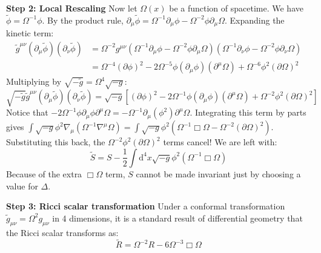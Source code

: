 \begin{solution}
\textbf{Step 2: Local Rescaling}
Now let $\Omega(x)$ be a function of spacetime. We have $\tilde{\phi} = \Omega^{-1} \phi$.
By the product rule, $\partial_\mu \tilde{\phi} = \Omega^{-1} \partial_\mu \phi - \Omega^{-2} \phi \partial_\mu \Omega$.
Expanding the kinetic term:
\[ \begin{aligned}
    \tilde{g}^{\mu\nu} (\partial_\mu \tilde{\phi}) (\partial_\nu \tilde{\phi}) &= \Omega^{-2} g^{\mu\nu} (\Omega^{-1} \partial_\mu \phi - \Omega^{-2} \phi \partial_\mu \Omega) (\Omega^{-1} \partial_\nu \phi - \Omega^{-2} \phi \partial_\nu \Omega) \\
    &= \Omega^{-4} (\partial \phi)^2 - 2\Omega^{-5} \phi (\partial_\mu \phi)(\partial^\mu \Omega) + \Omega^{-6} \phi^2 (\partial \Omega)^2
\end{aligned} \]
Multiplying by $\sqrt{-\tilde{g}} = \Omega^4 \sqrt{-g}$:
\[ \sqrt{-\tilde{g}} \tilde{g}^{\mu\nu} (\partial_\mu \tilde{\phi}) (\partial_\nu \tilde{\phi}) = \sqrt{-g} \left[ (\partial \phi)^2 - 2\Omega^{-1} \phi (\partial_\mu \phi)(\partial^\mu \Omega) + \Omega^{-2} \phi^2 (\partial \Omega)^2 \right] \]
Notice that $-2\Omega^{-1} \phi \partial_\mu \phi \partial^\mu \Omega = -\Omega^{-1} \partial_\mu(\phi^2) \partial^\mu \Omega$.
Integrating this term by parts gives $\int \sqrt{-g} \phi^2 \nabla_\mu (\Omega^{-1} \nabla^\mu \Omega) = \int \sqrt{-g} \phi^2 \left( \Omega^{-1} \Box \Omega - \Omega^{-2} (\partial \Omega)^2 \right)$.
Substituting this back, the $\Omega^{-2} \phi^2 (\partial \Omega)^2$ terms cancel!
We are left with:
\[ \tilde{S} = S - \frac{1}{2} \int \mathrm{d}^4 x \sqrt{-g} \phi^2 \left( \Omega^{-1} \Box \Omega \right) \]
Because of the extra $\Box \Omega$ term, $S$ cannot be made invariant just by choosing a value for $\Delta$.

\textbf{Step 3: Ricci scalar transformation}
Under a conformal transformation $\tilde{g}_{\mu\nu} = \Omega^2 g_{\mu\nu}$ in 4 dimensions, it is a standard result of differential geometry that the Ricci scalar transforms as:
\[ \tilde{R} = \Omega^{-2} R - 6 \Omega^{-3} \Box \Omega \]


\end{solution}
